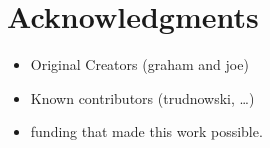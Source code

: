 \chapter*{Acknowledgments}

\begin{itemize}
\item Original Creators (graham and joe)
\item Known contributors (trudnowski, \ldots)
\item funding that made this work possible.
\end{itemize}
